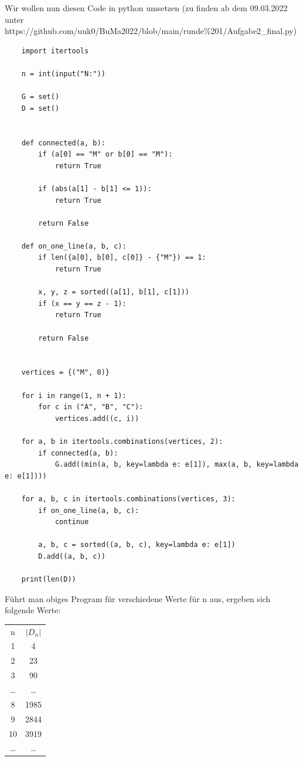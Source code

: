 \documentclass[11pt]{article}
\begin{document}
    \newpage

    Wir wollen nun diesen Code in python umsetzen (zu finden ab dem 09.03.2022 unter https://github.com/uuk0/BuMa2022/blob/main/runde\%201/Aufgabe2\_final.py)

    \lstset{language=Python}
    \lstset{frame=lines}
    \lstset{basicstyle=\footnotesize}
    \begin{lstlisting}
    import itertools

    n = int(input("N:"))

    G = set()
    D = set()


    def connected(a, b):
        if (a[0] == "M" or b[0] == "M"):
            return True

        if (abs(a[1] - b[1] <= 1)):
            return True

        return False

    def on_one_line(a, b, c):
        if len({a[0], b[0], c[0]} - {"M"}) == 1:
            return True

        x, y, z = sorted((a[1], b[1], c[1]))
        if (x == y == z - 1):
            return True

        return False


    vertices = {("M", 0)}

    for i in range(1, n + 1):
        for c in ("A", "B", "C"):
            vertices.add((c, i))

    for a, b in itertools.combinations(vertices, 2):
        if connected(a, b):
            G.add((min(a, b, key=lambda e: e[1]), max(a, b, key=lambda e: e[1])))

    for a, b, c in itertools.combinations(vertices, 3):
        if on_one_line(a, b, c):
            continue

        a, b, c = sorted((a, b, c), key=lambda e: e[1])
        D.add((a, b, c))

    print(len(D))
    \end{lstlisting}

    \newpage

    Führt man obiges Program für verschiedene Werte für n aus, ergeben sich folgende Werte:

    \begin{tabular}{c c}
        n & $|D_n|$ \\
        1 & 4 \\
        2 & 23 \\
        3 & 90 \\
        \ldots & \ldots \\
        8 & 1985 \\
        9 & 2844 \\
        10 & 3919 \\
        \ldots & \ldots \\
    \end{tabular}
\end{document}
